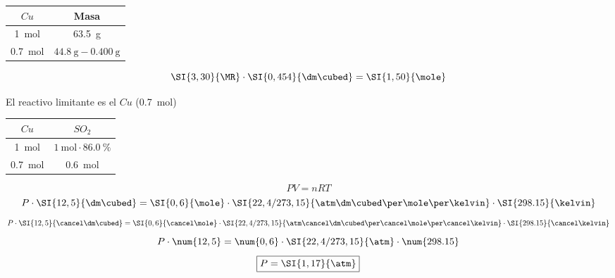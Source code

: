 \documentclass[../Práctica.root.tex]{subfiles}
\begin{document}
\begin{enumerate}
\begin{enumerate}
\begin{enumerate}[label=\roman*)]
                              \begin{center}
                                  \begin{tabular}{c|c}
                                      $Cu$            & Masa                           \\
                                      \hline
                                      \SI{1}{\mole}   & \SI{63,5}{\g}                  \\
                                      \SI{0,7}{\mole} & $\SI{44,8}{\g}-\SI{0,400}{\g}$ \\
                                  \end{tabular}
                              \end{center}

                              \[ \SI{3,30}{\MR}\cdot\SI{0,454}{\dm\cubed} = \SI{1,50}{\mole} \]

                              El reactivo limitante es el $Cu$ (\SI{0,7}{\mole})
                              \begin{center}
                                  \begin{tabular}{c|c}
                                      $Cu$            & $SO_2$                                  \\
                                      \hline
                                      \SI{1}{\mole}   & $\SI{1}{\mole}\cdot\SI{86,0}{\percent}$ \\
                                      \SI{0,7}{\mole} & \SI{0,6}{\mole}
                                  \end{tabular}
                              \end{center}
                              \[ PV = nRT \]
                              \[
                                  P\cdot\SI{12,5}{\dm\cubed}
                                  = \SI{0,6}{\mole}
                                  \cdot\SI{22,4/273,15}{\atm\dm\cubed\per\mole\per\kelvin}
                                  \cdot\SI{298.15}{\kelvin}
                              \]
                              \[
                                  P\cdot\SI{12,5}{\cancel\dm\cubed}
                                  = \SI{0,6}{\cancel\mole}
                                  \cdot\SI{22,4/273,15}{\atm\cancel\dm\cubed\per\cancel\mole\per\cancel\kelvin}
                                  \cdot\SI{298.15}{\cancel\kelvin}
                              \]
                              \[
                                  P\cdot\num{12,5}
                                  = \num{0,6}
                                  \cdot\SI{22,4/273,15}{\atm}
                                  \cdot\num{298.15}
                              \]
                              \[ \boxed{P = \SI{1,17}{\atm}} \]


\end{enumerate}
\end{enumerate}
\end{enumerate}
\end{document}
